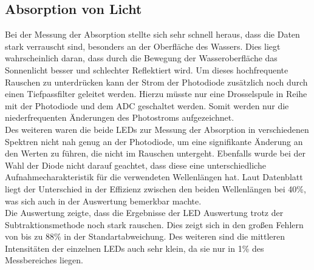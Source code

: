 \documentclass[12pt,a4paper,titlepage,headinclude,bibtotoc]{scrartcl}
\numberwithin{equation}{subsection}
\begin{document}
\subsection{Absorption von Licht}
Bei der Messung der Absorption stellte sich sehr schnell heraus, dass die Daten stark verrauscht sind, besonders an der Oberfläche des Wassers.
Dies liegt wahrscheinlich daran, dass durch die Bewegung der Wasseroberfläche das Sonnenlicht besser und schlechter Reflektiert wird.
Um dieses hochfrequente Rauschen zu unterdrücken kann der Strom der Photodiode zusätzlich noch durch einen Tiefpassfilter geleitet werden.
Hierzu müsste nur eine Drosselspule in Reihe mit der Photodiode und dem ADC geschaltet werden.
Somit werden nur die niederfrequenten Änderungen des Photostroms aufgezeichnet.\\
Des weiteren waren die beide LEDs zur Messung der Absorption in verschiedenen Spektren nicht nah genug an der Photodiode, um eine signifikante Änderung an den Werten zu führen, die nicht im Rauschen untergeht.
Ebenfalls wurde bei der Wahl der Diode nicht darauf geachtet, dass diese eine unterschiedliche Aufnahmecharakteristik für die verwendeten Wellenlängen hat.
Laut Datenblatt \cite[20]{PHOTODatenblatt} liegt der Unterschied in der Effizienz zwischen den beiden Wellenlängen bei 40\%, was sich auch in der Auswertung bemerkbar machte.\\
Die Auswertung zeigte, dass die Ergebnisse der LED Auswertung trotz der Subtraktionsmethode noch stark rauschen.
Dies zeigt sich in den großen Fehlern von bis zu 88\% in der Standartabweichung.
Des weiteren sind die mittleren Intensitäten der einzelnen LEDs auch sehr klein, da sie nur in 1\% des Messbereiches liegen.
\end{document}
